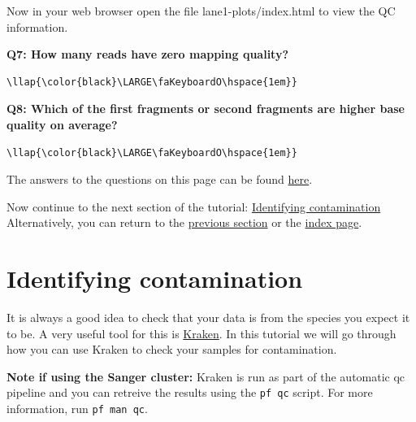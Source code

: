 \documentclass[11pt]{article}
\begin{document}
    Now in your web browser open the file lane1-plots/index.html to view the
QC information.

\textbf{Q7: How many reads have zero mapping quality?}

\begin{terminalinput}
\begin{Verbatim}[commandchars=\\\{\}]
\llap{\color{black}\LARGE\faKeyboardO\hspace{1em}}
\end{Verbatim}
\end{terminalinput}

    \textbf{Q8: Which of the first fragments or second fragments are higher
base quality on average?}

\begin{terminalinput}
\begin{Verbatim}[commandchars=\\\{\}]
\llap{\color{black}\LARGE\faKeyboardO\hspace{1em}}
\end{Verbatim}
\end{terminalinput}

    The answers to the questions on this page can be found
\href{assessment-answers.ipynb}{here}.

Now continue to the next section of the tutorial:
\href{contamination.ipynb}{Identifying contamination}\\
Alternatively, you can return to the \href{conversion.ipynb}{previous
section} or the \href{index.ipynb}{index page}.





\newpage






    \hypertarget{identifying-contamination}{%
\section{Identifying contamination}\label{identifying-contamination}}

It is always a good idea to check that your data is from the species you
expect it to be. A very useful tool for this is
\href{https://www.ebi.ac.uk/research/enright/software/kraken}{Kraken}.
In this tutorial we will go through how you can use Kraken to check your
samples for contamination.

\textbf{Note if using the Sanger cluster:} Kraken is run as part of the
automatic qc pipeline and you can retreive the results using the
\texttt{pf\ qc} script. For more information, run \texttt{pf\ man\ qc}.
\end{document}
